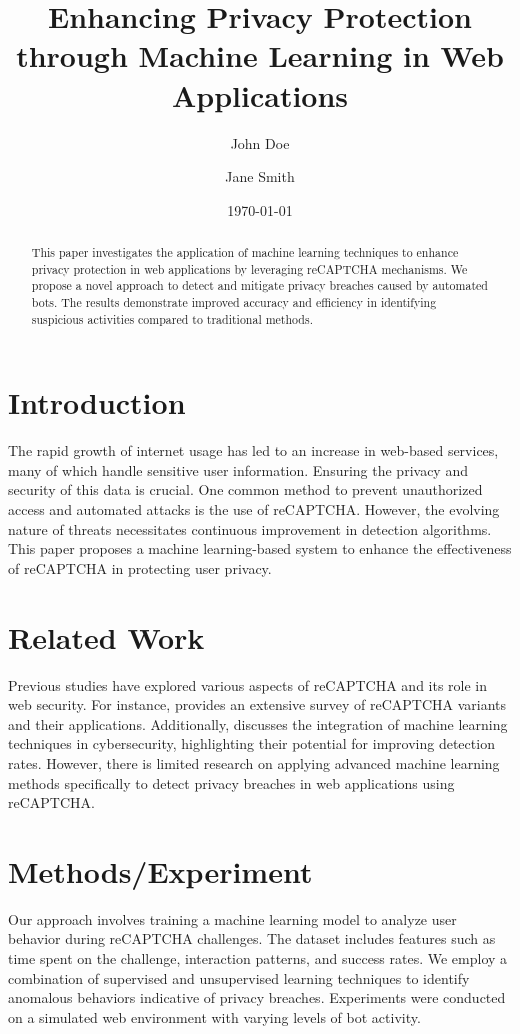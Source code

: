\documentclass{article}
\title{Enhancing Privacy Protection through Machine Learning in Web Applications}
\author{John Doe \and Jane Smith}
\date{\today}
\begin{document}
\maketitle

\begin{abstract}
This paper investigates the application of machine learning techniques to enhance privacy protection in web applications by leveraging reCAPTCHA mechanisms. We propose a novel approach to detect and mitigate privacy breaches caused by automated bots. The results demonstrate improved accuracy and efficiency in identifying suspicious activities compared to traditional methods.
\end{abstract}

\section{Introduction}
The rapid growth of internet usage has led to an increase in web-based services, many of which handle sensitive user information. Ensuring the privacy and security of this data is crucial. One common method to prevent unauthorized access and automated attacks is the use of reCAPTCHA. However, the evolving nature of threats necessitates continuous improvement in detection algorithms. This paper proposes a machine learning-based system to enhance the effectiveness of reCAPTCHA in protecting user privacy.

\section{Related Work}
Previous studies have explored various aspects of reCAPTCHA and its role in web security. For instance, \cite{reCaptchaSurvey} provides an extensive survey of reCAPTCHA variants and their applications. Additionally, \cite{MLinSecurity} discusses the integration of machine learning techniques in cybersecurity, highlighting their potential for improving detection rates. However, there is limited research on applying advanced machine learning methods specifically to detect privacy breaches in web applications using reCAPTCHA.

\section{Methods/Experiment}
Our approach involves training a machine learning model to analyze user behavior during reCAPTCHA challenges. The dataset includes features such as time spent on the challenge, interaction patterns, and success rates. We employ a combination of supervised and unsupervised learning techniques to identify anomalous behaviors indicative of privacy breaches. Experiments were conducted on a simulated web environment with varying levels of bot activity.
\end{document}

